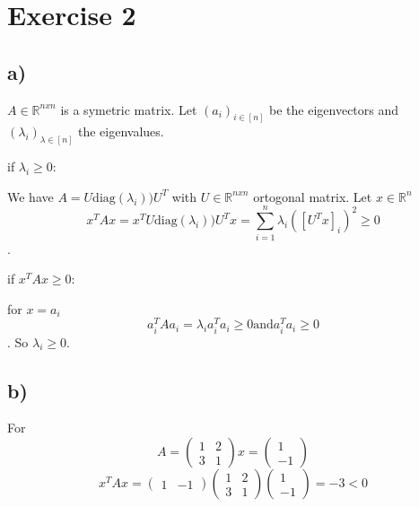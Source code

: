 \section*{Exercise 2}
\subsection*{a)}
$A\in \mathbb{R}^{nxn}$ is a symetric matrix.
Let $(a_i)_{i\in[n]}$ be the eigenvectors and $(\lambda_i)_{\lambda \in [n]}$ the eigenvalues.

if $\lambda_i \ge 0$:

We have $A=U\text{diag}(\lambda_i))U^T$ with $U \in \mathbb{R}^{nxn}$ ortogonal matrix.
Let $x \in \mathbb{R}^n$ 
\[x^TAx = x^TU\text{diag}(\lambda_i))U^Tx = \sum_{i=1}^{n}\lambda_i\left([U^Tx]_i\right)^2\ge0\].

if $x^TAx \ge 0$:

for $x = a_i$
\[a_i^TAa_i = \lambda_ia_i^Ta_i\ge0 \text{and} a_i^Ta_i \ge0\].
So $\lambda_i \ge 0$.

\subsection*{b)}
For \[A=\left(\begin{matrix}
1&2\\3&1
\end{matrix}\right)x=\left(\begin{matrix}
1\\-1
\end{matrix}\right)\]
\[x^TAx = \left(\begin{matrix}
1&-1
\end{matrix}\right)\left(\begin{matrix}
1&2\\3&1
\end{matrix}\right)\left(\begin{matrix}1\\-1
\end{matrix}\right) = -3 < 0\]